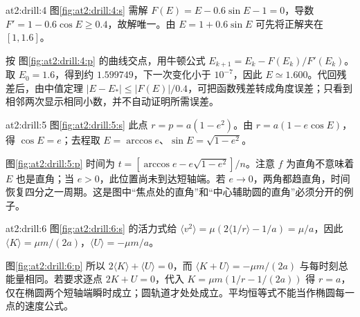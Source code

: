 \begin{drillsolution}{at2:drill:4}
图\ref{fig:at2:drill:4:s} 需解 $F(E)=E-0.6\sin E-1=0$，导数 $F'=1-0.6\cos E\ge0.4$，故解唯一。由 $E=1+0.6\sin E$ 可先将正解夹在 $[1,1.6]$。

按 图\ref{fig:at2:drill:4:p} 的曲线交点，用牛顿公式 $E_{k+1}=E_k-F(E_k)/F'(E_k)$。取 $E_0=1.6$，得到约 $1.599749$，下一次变化小于 $10^{-7}$，因此 $E\simeq1.600$。代回残差后，由中值定理 $|E-E_*|\le|F(E)|/0.4$，可把函数残差转成角度误差；只看到相邻两次显示相同小数，并不自动证明所需误差。\end{drillsolution}
\begin{drillsolution}{at2:drill:5}
  图\ref{fig:at2:drill:5:s} 此点 $r=p=a(1-e^2)$。由 $r=a(1-e\cos E)$，得 $\cos E=e$；去程取 $E=\arccos e$、$\sin E=\sqrt{1-e^2}$。

  图\ref{fig:at2:drill:5:p} 时间为 $t=[\arccos e-e\sqrt{1-e^2}]/n$。注意 $f$ 为直角不意味着 $E$ 也是直角；当 $e>0$，此位置尚未到达短轴端。若 $e\to0$，两角都趋直角，时间恢复四分之一周期。这是图中“焦点处的直角”和“中心辅助圆的直角”必须分开的例子。\end{drillsolution}
\begin{drillsolution}{at2:drill:6}
  图\ref{fig:at2:drill:6:s} 的活力式给 $\langle v^2\rangle=\mu(2\langle1/r\rangle-1/a)=\mu/a$，因此 $\langle K\rangle=\mu m/(2a)$，$\langle U\rangle=-\mu m/a$。

  图\ref{fig:at2:drill:6:p} 所以 $2\langle K\rangle+\langle U\rangle=0$，而 $\langle K+U\rangle=-\mu m/(2a)$ 与每时刻总能量相同。若要求逐点 $2K+U=0$，代入 $K=\mu m(1/r-1/(2a))$ 得 $r=a$，仅在椭圆两个短轴端瞬时成立；圆轨道才处处成立。平均恒等式不能当作椭圆每一点的速度公式。\end{drillsolution}
